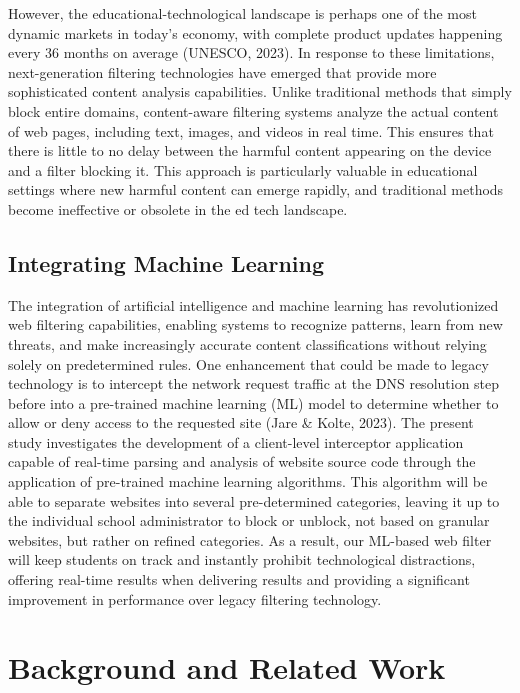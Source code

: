 \documentclass[
  titlepage]{article}
\begin{document}
However, the educational-technological landscape is perhaps one of the
most dynamic markets in today's economy, with complete product updates
happening every 36 months on average (UNESCO, 2023). In response to
these limitations, next-generation filtering technologies have emerged
that provide more sophisticated content analysis capabilities. Unlike
traditional methods that simply block entire domains, content-aware
filtering systems analyze the actual content of web pages, including
text, images, and videos in real time. This ensures that there is little
to no delay between the harmful content appearing on the device and a
filter blocking it. This approach is particularly valuable in
educational settings where new harmful content can emerge rapidly, and
traditional methods become ineffective or obsolete in the ed tech
landscape.

\subsection{Integrating Machine
Learning}\label{integrating-machine-learning}

The integration of artificial intelligence and machine learning has
revolutionized web filtering capabilities, enabling systems to recognize
patterns, learn from new threats, and make increasingly accurate content
classifications without relying solely on predetermined rules. One
enhancement that could be made to legacy technology is to intercept the
network request traffic at the DNS resolution step before into a
pre-trained machine learning (ML) model to determine whether to allow or
deny access to the requested site (Jare \& Kolte, 2023). The present
study investigates the development of a client-level interceptor
application capable of real-time parsing and analysis of website source
code through the application of pre-trained machine learning algorithms.
This algorithm will be able to separate websites into several
pre-determined categories, leaving it up to the individual school
administrator to block or unblock, not based on granular websites, but
rather on refined categories. As a result, our ML-based web filter will
keep students on track and instantly prohibit technological
distractions, offering real-time results when delivering results and
providing a significant improvement in performance over legacy filtering
technology.

\section{Background and Related Work}\label{background-and-related-work}
\end{document}
